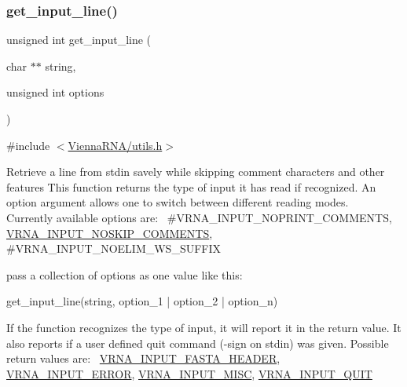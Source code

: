 \subsubsection{\texorpdfstring{get\+\_\+input\+\_\+line()}{get\_input\_line()}}
{\footnotesize\ttfamily unsigned int get\+\_\+input\+\_\+line (\begin{DoxyParamCaption}\item[{char $\ast$$\ast$}]{string,  }\item[{unsigned int}]{options }\end{DoxyParamCaption})}



{\ttfamily \#include $<$\hyperlink{utils_8h}{Vienna\+R\+N\+A/utils.\+h}$>$}

Retrieve a line from \textquotesingle{}stdin\textquotesingle{} savely while skipping comment characters and other features This function returns the type of input it has read if recognized. An option argument allows one to switch between different reading modes.~\newline
Currently available options are\+:~\newline
\#\+V\+R\+N\+A\+\_\+\+I\+N\+P\+U\+T\+\_\+\+N\+O\+P\+R\+I\+N\+T\+\_\+\+C\+O\+M\+M\+E\+N\+TS, \hyperlink{group__utils_ga0f6311f11bed1842e3a527ab27b294c6}{V\+R\+N\+A\+\_\+\+I\+N\+P\+U\+T\+\_\+\+N\+O\+S\+K\+I\+P\+\_\+\+C\+O\+M\+M\+E\+N\+TS}, \#\+V\+R\+N\+A\+\_\+\+I\+N\+P\+U\+T\+\_\+\+N\+O\+E\+L\+I\+M\+\_\+\+W\+S\+\_\+\+S\+U\+F\+F\+IX

pass a collection of options as one value like this\+: \begin{DoxyVerb}get_input_line(string, option_1 | option_2 | option_n) \end{DoxyVerb}


If the function recognizes the type of input, it will report it in the return value. It also reports if a user defined \textquotesingle{}quit\textquotesingle{} command (-\/sign on \textquotesingle{}stdin\textquotesingle{}) was given. Possible return values are\+:~\newline
\hyperlink{group__utils_ga2f0d8069e93d3ac54d9320d6bdb8e7e7}{V\+R\+N\+A\+\_\+\+I\+N\+P\+U\+T\+\_\+\+F\+A\+S\+T\+A\+\_\+\+H\+E\+A\+D\+ER}, \hyperlink{group__utils_gad403c9ea58f1836689404c2931419c8c}{V\+R\+N\+A\+\_\+\+I\+N\+P\+U\+T\+\_\+\+E\+R\+R\+OR}, \hyperlink{group__utils_ga8e3241b321c9c1a78a69e59e2e019a71}{V\+R\+N\+A\+\_\+\+I\+N\+P\+U\+T\+\_\+\+M\+I\+SC}, \hyperlink{group__utils_ga72f3c6ca5c83d2b9baed2922d19c403d}{V\+R\+N\+A\+\_\+\+I\+N\+P\+U\+T\+\_\+\+Q\+U\+IT}


